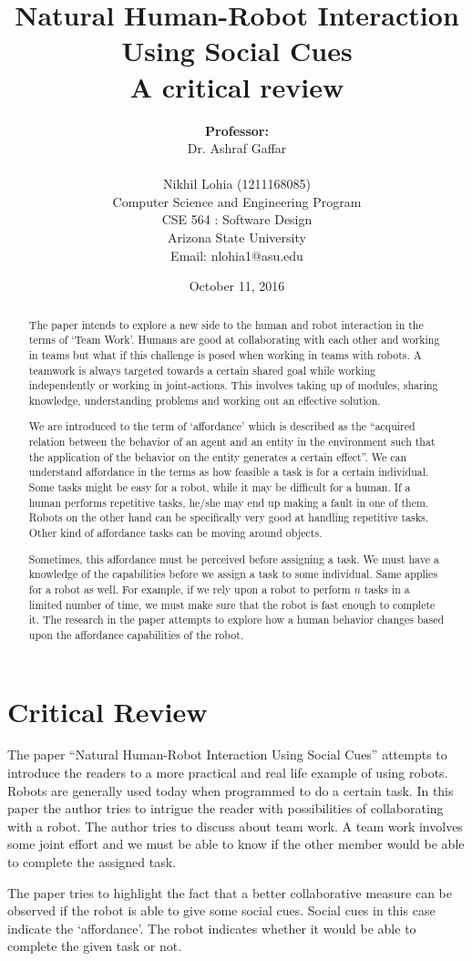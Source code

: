 \documentclass[letterpaper,12pt]{article}
\title{Natural Human-Robot Interaction Using Social Cues\\A critical review}
\author{\textbf{Professor:} \\  Dr. Ashraf Gaffar \\
\vspace{-0.35cm}
\\
  Nikhil Lohia (1211168085)\\
  \vspace{-0.25cm}
  \small{Computer Science and Engineering Program} \\
  \vspace{-0.25cm}
  \footnotesize{CSE 564 : Software Design}\\
  \vspace{-0.25cm}
  \footnotesize{Arizona State University}\\
  \vspace{-0.25cm}
  \footnotesize{Email: nlohia1@asu.edu}}
\date{October 11, 2016}
\begin{document}
\thispagestyle{empty}
\maketitle
\vspace{-0.95cm}
\begin{abstract}
\noindent The paper intends to explore a new side to the human and robot interaction in the terms of `Team Work'. Humans are good at collaborating with each other and working in teams but what if this challenge is posed when working in teams with robots. A teamwork is always targeted towards a certain shared goal while working independently or working in joint-actions. This involves taking up of modules, sharing knowledge, understanding problems and working out an effective solution. 
\par
\indent We are introduced to the term of `affordance' which is described as the ``acquired relation between the behavior of an agent and an entity in the environment such that the application of the behavior on the entity generates a certain effect''. We can understand affordance in the terms as how feasible a task is for a certain individual. Some tasks might be easy for a robot, while it may be difficult for a human. If a human performs repetitive tasks, he/she may end up making a fault in one of them. Robots on the other hand can be specifically very good at handling repetitive tasks. Other kind of affordance tasks can be moving around objects.
\par
\indent Sometimes, this affordance must be perceived before assigning a task. We must have a knowledge of the capabilities before we assign a task to some individual. Same applies for a robot as well. For example, if we rely upon a robot to perform $n$ tasks in a limited number of time, we must make sure that the robot is fast enough to complete it. The research in the paper attempts to explore how a human behavior changes based upon the affordance capabilities of the robot.
\end{abstract}

\section{Critical Review}
The paper ``Natural Human-Robot Interaction Using Social Cues'' attempts to introduce the readers to a more practical and real life example of using robots. Robots are generally used today when programmed to do a certain task. In this paper the author tries to intrigue the reader with possibilities of collaborating with a robot. The author tries to discuss about team work. A team work involves some joint effort and we must be able to know if the other member would be able to complete the assigned task.
\par
\indent The paper tries to highlight the fact that a better collaborative measure can be observed if the robot is able to give some social cues. Social cues in this case indicate the `affordance'. The robot indicates whether it would be able to complete the given task or not.
\end{document}
